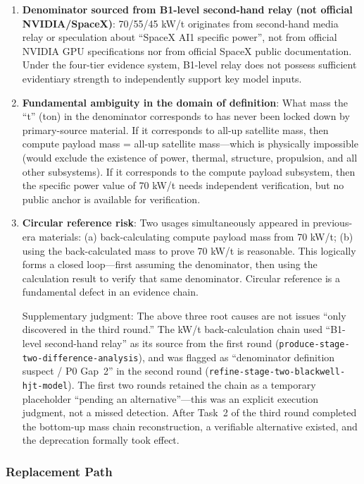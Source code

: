 \begin{enumerate}
  \item \textbf{Denominator sourced from B1-level second-hand relay (not official NVIDIA/SpaceX)}:
  70/55/45 kW/t originates from second-hand media relay or speculation about ``SpaceX AI1 specific power'', not from official NVIDIA GPU specifications nor from official SpaceX public documentation. Under the four-tier evidence system, B1-level relay does not possess sufficient evidentiary strength to independently support key model inputs.

  \item \textbf{Fundamental ambiguity in the domain of definition}:
  What mass the ``t'' (ton) in the denominator corresponds to has never been locked down by primary-source material. If it corresponds to all-up satellite mass, then compute payload mass = all-up satellite mass---which is physically impossible (would exclude the existence of power, thermal, structure, propulsion, and all other subsystems). If it corresponds to the compute payload subsystem, then the specific power value of 70 kW/t needs independent verification, but no public anchor is available for verification.

  \item \textbf{Circular reference risk}:
  Two usages simultaneously appeared in previous-era materials: (a) back-calculating compute payload mass from 70 kW/t; (b) using the back-calculated mass to prove 70 kW/t is reasonable. This logically forms a closed loop---first assuming the denominator, then using the calculation result to verify that same denominator. Circular reference is a fundamental defect in an evidence chain.

  Supplementary judgment: The above three root causes are not issues ``only discovered in the third round.'' The kW/t back-calculation chain used ``B1-level second-hand relay'' as its source from the first round (\texttt{produce-stage-two-difference-analysis}), and was flagged as ``denominator definition suspect / P0 Gap~2'' in the second round (\texttt{refine-stage-two-blackwell-hjt-model}). The first two rounds retained the chain as a temporary placeholder ``pending an alternative''---this was an explicit execution judgment, not a missed detection. After Task~2 of the third round completed the bottom-up mass chain reconstruction, a verifiable alternative existed, and the deprecation formally took effect.
\end{enumerate}

\subsubsection{Replacement Path}


